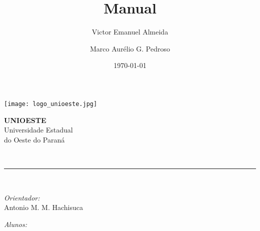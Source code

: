 \documentclass[12pt, a4paper]{article}
\author{Victor Emanuel Almeida \and Marco Aurélio G. Pedroso}
\title{Manual}
\date{\today}
\newcommand{\prof}{Antonio M. M. Hachisuca}
\begin{document}
\begin{titlepage}
	\centering
	\thispagestyle{fancy}

	\begin{minipage}{0.4\textwidth}
		\begin{flushleft}
			\texttt{[image: logo\_unioeste.jpg]}\\[1.0 cm]
		\end{flushleft}
	\end{minipage}
	\begin{minipage}{0.5\textwidth}
		\begin{flushright}\large
			\textsc{\LARGE\textbf{UNIOESTE}}\\
			\vspace{1cm}
			Universidade Estadual\\do Oeste do Paraná
		\end{flushright}
	\end{minipage}
	\vspace*{4.5 cm}

	{\huge\bfseries\thetitle}\\
	\rule{\linewidth}{0.2 mm}\\[1.5 cm]
	
	\vspace{2cm}
	\begin{minipage}[t]{0.4\textwidth}
		\begin{flushleft}\large
			\emph{Orientador:}\\
			\prof\\
		\end{flushleft}
	\end{minipage}
	\begin{minipage}[t]{0.5\textwidth}

		\begin{flushright}\large
			\emph{Alunos:}\\
			\theauthor
		\end{flushright}

	\end{minipage}\\[2 cm]
	
	\vfill\thedate
	\end{titlepage}

	\pagestyle{fancy}
	\fancyfoot[L]{}
	\fancyhead[L]{}
	\fancyhead[R]{}

	\tableofcontents
	\listoffigures
	\clearpage
\end{document}
